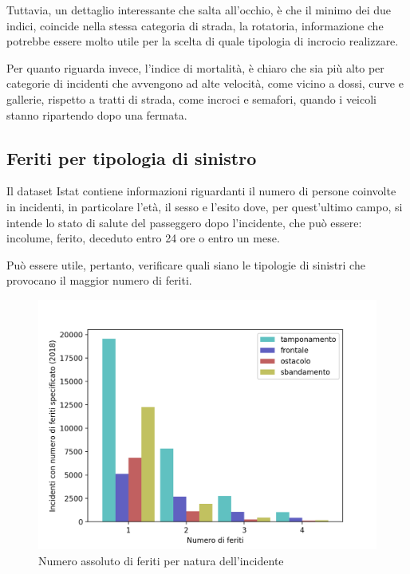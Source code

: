 \documentclass[a4paper]{report}
\begin{document}
Tuttavia, un dettaglio interessante che salta all'occhio, è che il minimo dei due indici, 
coincide nella stessa categoria di strada, 
la rotatoria, informazione che potrebbe essere molto utile per 
la scelta di quale tipologia di incrocio realizzare. 

Per quanto riguarda invece, l'indice di mortalità, è chiaro che sia più alto 
per categorie di incidenti che avvengono ad alte velocità, come vicino a dossi, 
curve e gallerie, rispetto a tratti di strada, come incroci e semafori, 
quando i veicoli stanno ripartendo dopo una fermata.


\subsection{Feriti per tipologia di sinistro}

Il dataset Istat contiene informazioni riguardanti il numero di persone coinvolte 
in incidenti, in particolare l'età, il sesso e l'esito dove, 
per quest'ultimo campo, si intende lo stato di salute del passeggero 
dopo l'incidente, che può essere: incolume, ferito, deceduto entro 24 ore o entro un mese. 

Può essere utile, pertanto, verificare quali siano le tipologie di 
sinistri che provocano il maggior numero di feriti.

\begin{figure}
    \includegraphics[width=\linewidth]{../src/incidenti/incidenti_senza_coords/natura_incidente/natura_incidente.png}
    \caption{Numero assoluto di feriti per natura dell'incidente}
    \label{fig:numero-feriti}
\end{figure}
\end{document}

